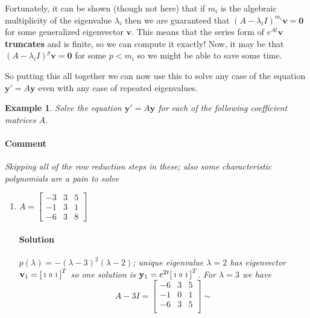 \documentclass[letterpaper, 11pt, openany]{book}
\theoremstyle{mytheoremstyle}
\theoremstyle{myexamplestyle}
\newtheorem{example}{Example}[section]
\newenvironment{solution}{\paragraph{\sffamily \smaller \fontseries{b}\selectfont Solution}}{\hfill\faSquare}
\newenvironment{commentary}{\paragraph{\sffamily \smaller \fontseries{b}\selectfont Comment}}{}
\begin{document}
Fortunately, it can be shown (though not here) that if \(m_{i}\) is the algebraic multiplicity of the eigenvalue \(\lambda_{i}\) then we are guaranteed that \((A - \lambda_{i}I)^{m_{i}} \mathbf{v}= \mathbf{0}\) for some generalized eigenvector \(\mathbf{v}\). This means that the series form of \(e^{At}\mathbf{v}\) \textbf{truncates} and is finite, so we can compute it exactly! Now, it may be that \((A - \lambda_{i}I)^{p} \mathbf{v}= \mathbf{0}\) for some \(p < m_{i}\) so we might be able to save some time.

So putting this all together we can now use this to solve any case of the equation \(\mathbf{y}' = A\mathbf{y}\) even with any case of repeated eigenvalues.

\begin{example}\label{e:de-sys-exp-mat-rep-evals}
    Solve the equation \(\mathbf{y}' = A\mathbf{y}\) for each of the following coefficient matrices \(A\).
    \begin{commentary}
        Skipping all of the row reduction steps in these; also some characteristic polynomials are a pain to solve \faFrown
    \end{commentary}
    \begin{enumerate}
        \item \(A = \begin{bmatrix}
            -3 & 3 & 5\\
            -1 & 3 & 1\\
            -6 & 3 & 8 
        \end{bmatrix}\)
        \begin{solution}
            \(p(\lambda) = -(\lambda -3)^2 (\lambda -2)\); unique eigenvalue \(\lambda = 2\) has eigenvector \(\mathbf{v}_{1} = \begin{bsmallmatrix}1 & 0 & 1\end{bsmallmatrix}^{T}\) so one solution is \(\mathbf{y}_{1} =e^{2t} \begin{bsmallmatrix}1 & 0 & 1\end{bsmallmatrix}^{T}\). For \(\lambda=3\) we have
            \[A - 3I = \left[
                        \begin{array}{ccc}
                        -6 & 3 & 5 \\
                        -1 & 0 & 1 \\
                        -6 & 3 & 5 \\
                        \end{array}
                        \right]
                        \sim 
\]
\end{solution}
\end{enumerate}
\end{example}
\end{document}
